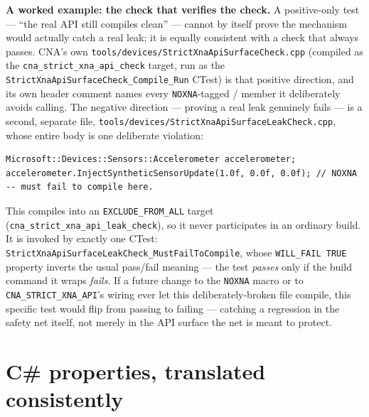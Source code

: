 \begin{sourcenote}
\textbf{A worked example: the check that verifies the check.} A positive-only test --- ``the
real API still compiles clean'' --- cannot by itself prove the mechanism would actually catch a
real leak; it is equally consistent with a check that always passes. CNA's own
\texttt{tools/\allowbreak{}devices/\allowbreak{}Strict\allowbreak{}Xna\allowbreak{}Api\allowbreak{}Surface\allowbreak{}Check.cpp} (compiled as the
\texttt{cna\allowbreak{}\_strict\allowbreak{}\_xna\allowbreak{}\_api\allowbreak{}\_check} target,
run as the \texttt{StrictXnaApiSurfaceCheck\allowbreak{}\_Compile\allowbreak{}\_Run} CTest) is
that positive direction, and its own header comment names every \texttt{NOXNA}-tagged
 /  member it deliberately avoids calling. The negative
direction --- proving a real leak genuinely fails --- is a second, separate file,
\texttt{tools/\allowbreak{}devices/\allowbreak{}Strict\allowbreak{}Xna\allowbreak{}Api\allowbreak{}Surface\allowbreak{}Leak\allowbreak{}Check.cpp}, whose entire body is one deliberate
violation:
\begin{lstlisting}
Microsoft::Devices::Sensors::Accelerometer accelerometer;
accelerometer.InjectSyntheticSensorUpdate(1.0f, 0.0f, 0.0f); // NOXNA -- must fail to compile here.
\end{lstlisting}
This compiles into an \texttt{EXCLUDE\_FROM\_ALL} target
(\texttt{cna\allowbreak{}\_strict\allowbreak{}\_xna\allowbreak{}\_api\allowbreak{}\_leak\allowbreak{}\_check}),
so it never participates in an ordinary build. It is invoked by exactly one CTest:
\texttt{Strict\allowbreak{}Xna\allowbreak{}Api\allowbreak{}Surface\allowbreak{}Leak\allowbreak{}Check\allowbreak{}\_Must\allowbreak{}Fail\allowbreak{}To\allowbreak{}Compile}, whose
\texttt{WILL\_FAIL TRUE} property inverts the usual pass/fail meaning --- the test
\emph{passes} only if the build command it wraps \emph{fails}. If a future change to the
\texttt{NOXNA} macro or to \texttt{CNA\_STRICT\_XNA\_API}'s wiring ever let this
deliberately-broken file compile, this specific test would flip from passing to failing ---
catching a regression in the safety net itself, not merely in the API surface the net is meant
to protect.
\end{sourcenote}

\section{C\# properties, translated consistently}


